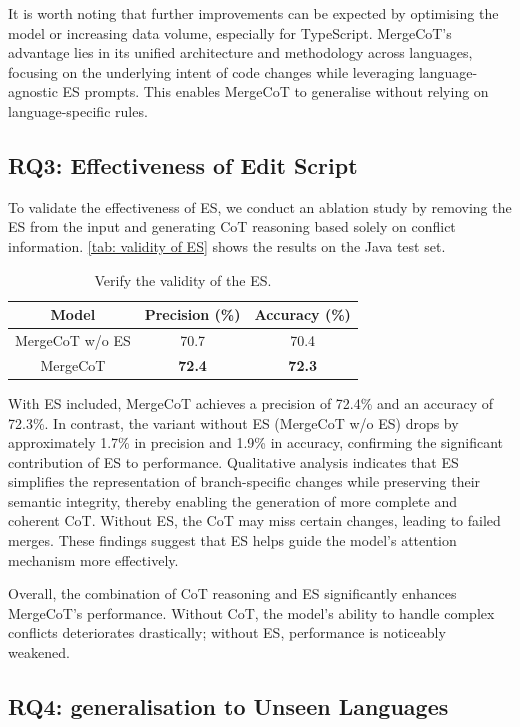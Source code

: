\documentclass[sigconf,review,anonymous]{acmart}
\begin{document}
It is worth noting that further improvements can be expected by optimising the model or increasing data volume, especially for TypeScript. MergeCoT’s advantage lies in its unified architecture and methodology across languages, focusing on the underlying intent of code changes while leveraging language-agnostic ES prompts. This enables MergeCoT to generalise without relying on language-specific rules.

\subsection{RQ3: Effectiveness of Edit Script}
To validate the effectiveness of ES, we conduct an ablation study by removing the ES from the input and generating CoT reasoning based solely on conflict information. \autoref{tab: validity of ES} shows the results on the Java test set.

\begin{table}[H]
\caption{Verify the validity of the ES.}
\begin{tabular}{ccc}
\hline
Model           & Precision (\%) & Accuracy (\%) \\ \hline
MergeCoT w/o ES & 70.7           & 70.4          \\
MergeCoT        & \textbf{72.4}  & \textbf{72.3}   \\ \hline
\end{tabular}
\label{tab: validity of ES}
\end{table}

With ES included, MergeCoT achieves a precision of 72.4\% and an accuracy of 72.3\%. In contrast, the variant without ES (MergeCoT w/o ES) drops by approximately 1.7\% in precision and 1.9\% in accuracy, confirming the significant contribution of ES to performance. Qualitative analysis indicates that ES simplifies the representation of branch-specific changes while preserving their semantic integrity, thereby enabling the generation of more complete and coherent CoT. Without ES, the CoT may miss certain changes, leading to failed merges. These findings suggest that ES helps guide the model’s attention mechanism more effectively.

Overall, the combination of CoT reasoning and ES significantly enhances MergeCoT’s performance. Without CoT, the model's ability to handle complex conflicts deteriorates drastically; without ES, performance is noticeably weakened.

\subsection{RQ4: generalisation to Unseen Languages}
\end{document}
